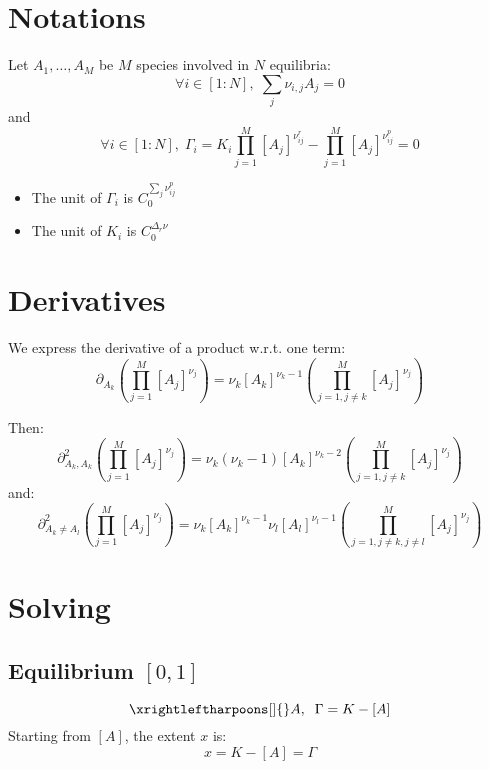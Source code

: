 \documentclass[aps,12pt]{revtex4}
\begin{document}
\section{Notations}

Let $A_1,\ldots,A_M$ be $M$ species involved in $N$ equilibria:
\begin{equation}
	\forall i\in[1:N], \; \sum_j \nu_{i,j} A_j = 0
\end{equation}
and
\begin{equation}
	\forall i\in[1:N], \; 
	\Gamma_i = K_i \prod_{j=1}^{M} [A_j]^{\nu^r_{ij}} 
	- \prod_{j=1}^{M} [A_j]^{\nu^p_{ij}} = 0
\end{equation}

\begin{itemize}
\item The unit of $\Gamma_i$ is $C_0^{\sum_j \nu^p_{ij} }$
\item The unit of $K_i$ is $C_0^{\Delta_r \nu}$
\end{itemize}


\section{Derivatives}
We express the derivative of a product w.r.t. one term:
\begin{equation}
	\partial_{A_k} \left( \prod_{j=1}^{M} [A_j]^{\nu_{j}} \right)  =
	\nu_k [A_k]^{\nu_k-1} \left( \prod_{j=1,j\not=k}^{M} [A_j]^{\nu_{j}} \right)
\end{equation}

Then:
\begin{equation}
	\partial^2_{A_k, A_k} \left( \prod_{j=1}^{M} [A_j]^{\nu_{j}} \right)  =
	\nu_k (\nu_k-1) [A_k]^{\nu_k-2} \left( \prod_{j=1,j\not=k}^{M} [A_j]^{\nu_{j}} \right)
\end{equation}
and:
\begin{equation}
	\partial^2_{A_k\not=A_l} \left( \prod_{j=1}^{M} [A_j]^{\nu_{j}} \right)  =
	\nu_k [A_k]^{\nu_k-1} \nu_l [A_l]^{\nu_l-1}\left( \prod_{j=1,j\not=k,j\not=l}^{M} [A_j]^{\nu_{j}} \right)
\end{equation}

\section{Solving}

\subsection{Equilibrium $[0,1]$}
\begin{equation}
	\xrightleftharpoons[]{} A, \;\; \Gamma = K - [A]
\end{equation}
Starting from $[A]$, the extent $x$ is:
\begin{equation}
	x = K-[A] = \Gamma
\end{equation}
\end{document}
